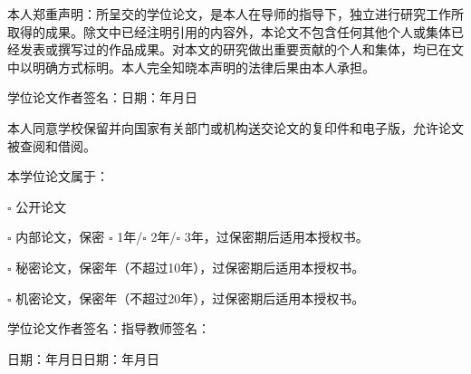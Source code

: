\thispagestyle{empty}
本人郑重声明：所呈交的学位论文，是本人在导师的指导下，独立进行研究工作所取得的成果。除文中已经注明引用的内容外，本论文不包含任何其他个人或集体已经发表或撰写过的作品成果。对本文的研究做出重要贡献的个人和集体，均已在文中以明确方式标明。本人完全知晓本声明的法律后果由本人承担。

\vspace{2em}
\noindent 学位论文作者签名：\hfill 日期：\quad 年\quad 月\quad 日

\vspace{3em}
本人同意学校保留并向国家有关部门或机构送交论文的复印件和电子版，允许论文被查阅和借阅。

\noindent 本学位论文属于：

\noindent $\square$ 公开论文

\noindent $\square$ 内部论文，保密 $\square$ 1年/$\square$ 2年/$\square$ 3年，过保密期后适用本授权书。

\noindent $\square$ 秘密论文，保密\quad 年（不超过10年），过保密期后适用本授权书。

\noindent $\square$ 机密论文，保密\quad 年（不超过20年），过保密期后适用本授权书。

\vspace{2em}
\noindent 学位论文作者签名：\hfill 指导教师签名：

\noindent 日期：\quad 年\quad 月\quad 日\hfill 日期：\quad 年\quad 月\quad 日

\clearpage
